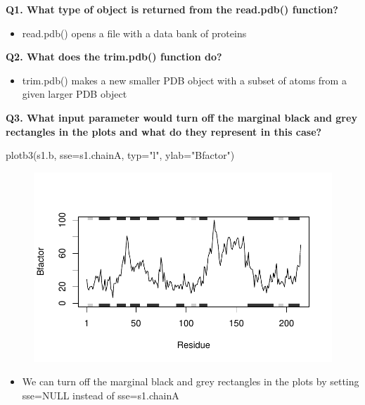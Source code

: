 \documentclass[
  letterpaper,
  DIV=11,
  numbers=noendperiod]{scrartcl}
\newenvironment{Shaded}{\begin{snugshade}}{\end{snugshade}}
\newcommand{\AttributeTok}[1]{\textcolor[rgb]{0.40,0.45,0.13}{#1}}
\newcommand{\FunctionTok}[1]{\textcolor[rgb]{0.28,0.35,0.67}{#1}}
\newcommand{\NormalTok}[1]{\textcolor[rgb]{0.00,0.23,0.31}{#1}}
\newcommand{\StringTok}[1]{\textcolor[rgb]{0.13,0.47,0.30}{#1}}
\providecommand{\tightlist}{%
  \setlength{\itemsep}{0pt}\setlength{\parskip}{0pt}}\usepackage{longtable,booktabs,array}
\begin{document}
\textbf{Q1. What type of object is returned from the read.pdb()
function?}

\begin{itemize}
\tightlist
\item
  read.pdb() opens a file with a data bank of proteins
\end{itemize}

\textbf{Q2. What does the trim.pdb() function do?}

\begin{itemize}
\tightlist
\item
  trim.pdb() makes a new smaller PDB object with a subset of atoms from
  a given larger PDB object
\end{itemize}

\textbf{Q3. What input parameter would turn off the marginal black and
grey rectangles in the plots and what do they represent in this case?}

\begin{Shaded}
\begin{Highlighting}[]
\FunctionTok{plotb3}\NormalTok{(s1.b, }\AttributeTok{sse=}\NormalTok{s1.chainA, }\AttributeTok{typ=}\StringTok{"l"}\NormalTok{, }\AttributeTok{ylab=}\StringTok{"Bfactor"}\NormalTok{)}
\end{Highlighting}
\end{Shaded}

\begin{figure}[H]

{\centering \includegraphics{hw6_turnin_files/figure-pdf/unnamed-chunk-2-1.pdf}

}

\end{figure}

\begin{itemize}
\tightlist
\item
  We can turn off the marginal black and grey rectangles in the plots by
  setting sse=NULL instead of sse=s1.chainA
\end{itemize}
\end{document}
